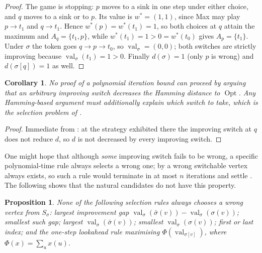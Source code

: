 \documentclass[11pt]{article}
\theoremstyle{plain}
\newtheorem{proposition}[theorem]{Proposition}
\newtheorem{corollary}[theorem]{Corollary}
\theoremstyle{definition}
\DeclareMathOperator{\val}{val}
\DeclareMathOperator{\Opt}{Opt}
\begin{document}
\begin{proof}
The game is stopping: $p$ moves to a sink in one step under either
choice, and $q$ moves to a sink or to $p$. Its value is $w^\ast=(1,1)$,
since Max may play $p\to t_1$ and $q\to t_1$. Hence
$w^\ast(p)=w^\ast(t_1)=1$, so both choices at $q$ attain the maximum and
$A_q=\{t_1,p\}$, while $w^\ast(t_1)=1>0=w^\ast(t_0)$ gives
$A_p=\{t_1\}$. Under $\sigma$ the token goes $q\to p\to t_0$, so
$\val_\sigma=(0,0)$; both switches are strictly improving because
$\val_\sigma(t_1)=1>0$. Finally $d(\sigma)=1$ (only $p$ is wrong) and
$d(\sigma[q])=1$ as well.
\end{proof}

\begin{corollary}\label{cor:hamming}
No proof of a polynomial iteration bound can proceed by arguing that an
arbitrary improving switch decreases the Hamming distance to $\Opt$. Any
Hamming-based argument must additionally explain \emph{which} switch to
take, which is the selection problem of .
\end{corollary}

\begin{proof}
Immediate from : at the strategy exhibited
there the improving switch at $q$ does not reduce $d$, so $d$ is not
decreased by every improving switch.
\end{proof}

One might hope that although \emph{some} improving switch fails to be
wrong, a specific polynomial-time rule always selects a wrong one; by
 a wrong switchable vertex always exists, so such a
rule would terminate in at most $n$ iterations and settle
. The following shows that the natural candidates do not
have this property.

\begin{proposition}\label{prop:rules-fail}
None of the following selection rules always chooses a wrong vertex from
$S_\sigma$: largest improvement gap
$\val_\sigma(\bar\sigma(v))-\val_\sigma(\sigma(v))$; smallest such gap;
largest $\val_\sigma(\bar\sigma(v))$; smallest $\val_\sigma(\sigma(v))$;
first or last index; and the one-step lookahead rule maximising
$\Phi(\val_{\sigma[v]})$, where $\Phi(x)=\sum_u x(u)$.
\end{proposition}
\end{document}
